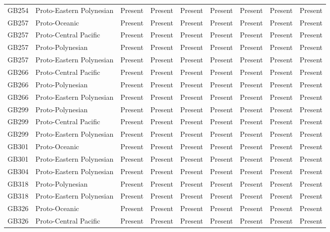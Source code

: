 \begin{longtable}{p{1.5cm}p{2.5cm}p{2.5cm}p{2.5cm}p{2.5cm}p{2.5cm}p{2.5cm}p{2.5cm}p{2.5cm}}
  GB254 & Proto-Eastern Polynesian & Present & Present & Present & Present & Present & Present & Present \\ 
  GB257 & Proto-Oceanic & Present & Present & Present & Present & Present & Present & Present \\ 
  GB257 & Proto-Central Pacific & Present & Present & Present & Present & Present & Present & Present \\ 
  GB257 & Proto-Polynesian & Present & Present & Present & Present & Present & Present & Present \\ 
  GB257 & Proto-Eastern Polynesian & Present & Present & Present & Present & Present & Present & Present \\ 
  GB266 & Proto-Central Pacific & Present & Present & Present & Present & Present & Present & Present \\ 
  GB266 & Proto-Polynesian & Present & Present & Present & Present & Present & Present & Present \\ 
  GB266 & Proto-Eastern Polynesian & Present & Present & Present & Present & Present & Present & Present \\ 
  GB299 & Proto-Polynesian & Present & Present & Present & Present & Present & Present & Present \\ 
  GB299 & Proto-Central Pacific & Present & Present & Present & Present & Present & Present & Present \\ 
  GB299 & Proto-Eastern Polynesian & Present & Present & Present & Present & Present & Present & Present \\ 
  GB301 & Proto-Oceanic & Present & Present & Present & Present & Present & Present & Present \\ 
  GB301 & Proto-Eastern Polynesian & Present & Present & Present & Present & Present & Present & Present \\ 
  GB304 & Proto-Eastern Polynesian & Present & Present & Present & Present & Present & Present & Present \\ 
  GB318 & Proto-Polynesian & Present & Present & Present & Present & Present & Present & Present \\ 
  GB318 & Proto-Eastern Polynesian & Present & Present & Present & Present & Present & Present & Present \\ 
  GB326 & Proto-Oceanic & Present & Present & Present & Present & Present & Present & Present \\ 
  GB326 & Proto-Central Pacific & Present & Present & Present & Present & Present & Present & Present \\ 

\end{longtable}
